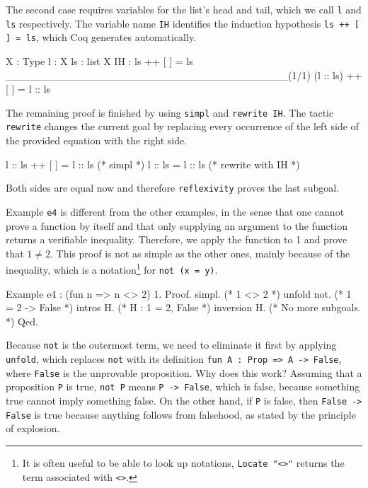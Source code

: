 \documentclass[paper = a4, fleqn, abstract=on, twoside]{scrreprt}
\newcommand{\coqinline}[1]{\texttt{#1}}
\begin{document}
\par
The second case requires variables for the list's head and tail, which we call \coqinline{l} and \coqinline{ls} respectively. The variable name \coqinline{IH} identifies the induction hypothesis \coqinline{ls ++ [ ] = ls}, which Coq generates automatically.
\begin{coqcode}
X : Type
l : X
ls : list X
IH : ls ++ [ ] = ls
______________________________________(1/1)
(l :: ls) ++ [ ] = l :: ls
\end{coqcode}
The remaining proof is finished by using \coqinline{simpl} and \coqinline{rewrite IH}. The tactic \coqinline{rewrite} changes the current goal by replacing every occurrence of the left side of the provided equation with the right side.
\begin{coqcode}
 l :: ls  ++ [ ] = l :: ls (* simpl *)
 l :: ls         = l :: ls (* rewrite with IH *)
\end{coqcode}
Both sides are equal now and therefore \coqinline{reflexivity} proves the last subgoal.\\
\par \noindent
Example \coqinline{e4} is different from the other examples, in the sense that one cannot prove a function by itself and that only supplying an argument to the function returns a verifiable inequality. Therefore, we apply the function to 1 and prove that $1 \neq 2$. This proof is not as simple as the other ones, mainly because of the inequality, which is a notation\footnote{It is often useful to be able to look up notations, \coqinline{Locate "<>"} returns the term associated with \coqinline{<>}.} for \coqinline{not (x = y)}. 
\begin{coqcode}
Example e4 : (fun n => n <> 2) 1.
Proof.
  simpl.       (* 1 <> 2 *)
  unfold not.  (* 1 = 2 -> False *)
  intros H.    (* H : 1 = 2, False *)
  inversion H. (* No more subgoals. *)
Qed.
\end{coqcode}
Because \coqinline{not} is the outermost term, we need to eliminate it first by applying \coqinline{unfold}, which replaces \coqinline{not} with its definition \coqinline{fun A : Prop => A -> False}, where \coqinline{False} is the unprovable proposition. Why does this work?
Assuming that a proposition \coqinline{P} is true, \coqinline{not P} means \coqinline{P -> False}, which is false, because something true cannot imply something false. On the other hand, if \coqinline{P} is false, then \coqinline{False -> False} is true because anything follows from falsehood, as stated by the principle of explosion.
\par
\end{document}

